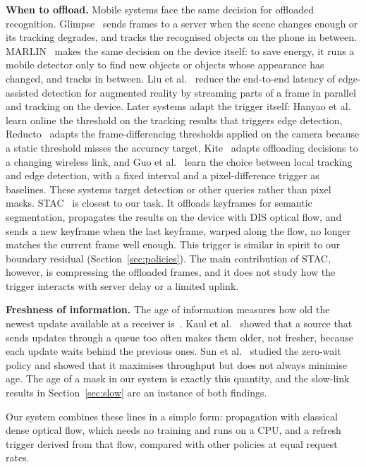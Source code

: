 \documentclass[conference]{IEEEtran}
\begin{document}
\textbf{When to offload.} Mobile systems face the same decision for offloaded recognition. Glimpse~\cite{chen2015glimpse} sends frames to a server when the scene changes enough or its tracking degrades, and tracks the recognised objects on the phone in between. MARLIN~\cite{apicharttrisorn2019marlin} makes the same decision on the device itself: to save energy, it runs a mobile detector only to find new objects or objects whose appearance has changed, and tracks in between. Liu et al.~\cite{liu2019edgear} reduce the end-to-end latency of edge-assisted detection for augmented reality by streaming parts of a frame in parallel and tracking on the device. Later systems adapt the trigger itself: Hanyao et al.~\cite{hanyao2021edge} learn online the threshold on the tracking results that triggers edge detection, Reducto~\cite{li2020reducto} adapts the frame-differencing thresholds applied on the camera because a static threshold misses the accuracy target, Kite~\cite{cong2024kite} adapts offloading decisions to a changing wireless link, and Guo et al.~\cite{guo2025ltedada} learn the choice between local tracking and edge detection, with a fixed interval and a pixel-difference trigger as baselines. These systems target detection or other queries rather than pixel masks. STAC~\cite{xiao2022stac} is closest to our task. It offloads keyframes for semantic segmentation, propagates the results on the device with DIS optical flow, and sends a new keyframe when the last keyframe, warped along the flow, no longer matches the current frame well enough. This trigger is similar in spirit to our boundary residual (Section~\ref{sec:policies}). The main contribution of STAC, however, is compressing the offloaded frames, and it does not study how the trigger interacts with server delay or a limited uplink.

\textbf{Freshness of information.} The age of information measures how old the newest update available at a receiver is~\cite{yates2021aoi}. Kaul et al.~\cite{kaul2012status} showed that a source that sends updates through a queue too often makes them older, not fresher, because each update waits behind the previous ones. Sun et al.~\cite{sun2016update} studied the zero-wait policy and showed that it maximises throughput but does not always minimise age. The age of a mask in our system is exactly this quantity, and the slow-link results in Section~\ref{sec:slow} are an instance of both findings.

Our system combines these lines in a simple form: propagation with classical dense optical flow, which needs no training and runs on a CPU, and a refresh trigger derived from that flow, compared with other policies at equal request rates.
\end{document}
